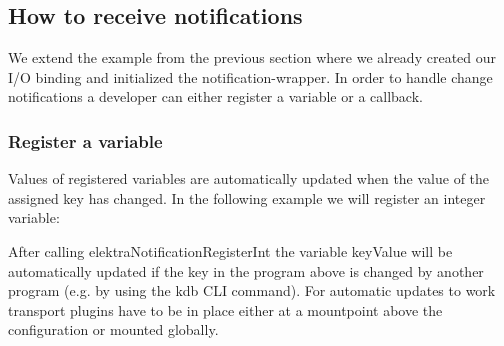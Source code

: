 \subsection*{How to receive notifications}

We extend the example from the previous section where we already created our I/O binding and initialized the notification-\/wrapper. In order to handle change notifications a developer can either register a variable or a callback.

\subsubsection*{Register a variable}

Values of registered variables are automatically updated when the value of the assigned key has changed. In the following example we will register an integer variable\+:




After calling {\ttfamily elektra\+Notification\+Register\+Int} the variable {\ttfamily key\+Value} will be automatically updated if the key in the program above is changed by another program (e.\+g. by using the {\ttfamily kdb} C\+LI command). For automatic updates to work transport plugins have to be in place either at a mountpoint above the configuration or mounted globally.

